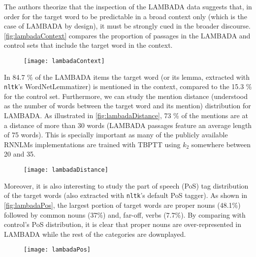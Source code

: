 The authors theorize that the inspection of the LAMBADA data suggests that, in order for the target word to be predictable in a broad context only (which is the case of LAMBADA by design), it must be strongly cued in the broader discourse. \autoref{fig:lambadaContext} compares the proportion of passages in the LAMBADA and control sets that include the target word in the context.

\begin{figure}[H]
	\centering
	\texttt{[image: lambadaContext]}
	\label{fig:lambadaContext}
\end{figure}

In 84.7 \% of the LAMBADA items the target word (or its lemma, extracted with \texttt{nltk}'s WordNetLemmatizer) is mentioned in the context, compared to the 15.3 \% for the control set. Furthermore, we can study the mention distance (understood as the number of words between the target word and its mention) distribution for LAMBADA. As illustrated in \autoref{fig:lambadaDistance}, 73 \% of the mentions are at a distance of more than 30 words (LAMBADA passages feature an average length of 75 words). This is specially important as many of the publicly available RNNLMs implementations are trained with TBPTT using $k_2$ somewhere between 20 and 35.
 
\begin{figure}[H]
	\centering
	\texttt{[image: lambadaDistance]}
	\label{fig:lambadaDistance}
\end{figure}

Moreover, it is also interesting to study the part of speech (PoS) tag distribution of the target words (also extracted with \texttt{nltk}'s default PoS tagger). As shown in \autoref{fig:lambadaPos}, the largest portion of target words are proper nouns (48.1\%) followed by common nouns (37\%) and, far-off, verbs (7.7\%). By comparing with control's PoS distribution, it is clear that proper nouns are over-represented in LAMBADA while the rest of the categories are downplayed.

\begin{figure}[H]
	\centering
	\texttt{[image: lambadaPos]}
	\label{fig:lambadaPos}
\end{figure}

